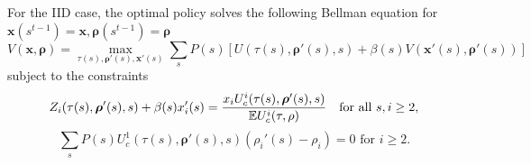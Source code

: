 \documentclass[thmsb,11pt]{article}
\begin{document}
%
%
%
%
%
For the IID case,  the optimal policy  solves the following Bellman equation for $\bm{x}(s^{t-1})=\bm{x},\bm{\rho}(s^{t-1})=\bm{\rho}$
%
 \begin{equation}
 \label{eq:ss-obj}
 	V(\bm x,\bm \rho) = \max_{\tau(s),\bm \rho'(s),\bm x'(s)}\sum_s P(s)\left[ U(\tau(s),\bm \rho'(s),s) + \beta(s) V(\bm x'(s),\bm \rho'(s))\right]
 \end{equation}
subject to the constraints
 \begin{equation}
 \label{eq:ss-imp}
 	Z_i(\tau(s),\bm \rho'(s),s) +\beta(s) x'_i(s) = \frac{x_i U^i_c(\tau(s),\bm \rho'(s),s)}{\mathbb{E} U^i_c(\tau,\rho)}\text{   for all  $s,i \geq 2$,}\\
 \end{equation}
\begin{equation}
\label{eq:bondcondtion}
 	\sum_s P(s)U^1_c(\tau(s),\bm \rho'(s),s)(\rho_i'(s)-\rho_i) = 0 \text{  for $i \geq 2.$}
\end{equation}
\end{document}
